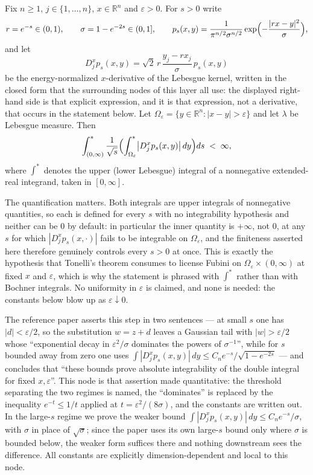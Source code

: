 \begin{lemma}
Fix $n \geq 1$, $j \in \{1,\ldots,n\}$, $x \in \mathbb{R}^n$ and $\varepsilon > 0$.
For $s > 0$ write
\[
  r = e^{-s} \in (0,1), \qquad \sigma = 1 - e^{-2s} \in (0,1],
  \qquad
  p_s(x,y) = \frac{1}{\pi^{n/2}\sigma^{n/2}}
      \exp\Bigl(-\frac{|rx-y|^2}{\sigma}\Bigr),
\]
and let
\[
  D_j^xp_s(x,y) = \sqrt2\,r\,\frac{y_j-rx_j}{\sigma}\,p_s(x,y)
\]
be the energy-normalized $x$-derivative of the Lebesgue kernel, written in the
closed form that the surrounding nodes of this layer all use: the displayed
right-hand side is that explicit expression, and it is that expression, not a
derivative, that occurs in the statement below.  Let
$\Omega_\varepsilon = \{y \in \mathbb{R}^n : |x-y| > \varepsilon\}$ and let
$\lambda$ be Lebesgue measure.  Then
\[
  \int^*_{(0,\infty)} \frac{1}{\sqrt s}
    \Bigl(\int^*_{\Omega_\varepsilon} \bigl|D_j^xp_s(x,y)\bigr|\,dy\Bigr) ds
  \;<\; \infty ,
\]
where $\int^*$ denotes the upper (lower Lebesgue) integral of a nonnegative
extended-real integrand, taken in $[0,\infty]$.

The quantification matters.  Both integrals are upper integrals of nonnegative
quantities, so each is defined for every $s$ with no integrability hypothesis
and neither can be $0$ by default: in particular the inner quantity is
$+\infty$, not $0$, at any $s$ for which $|D_j^xp_s(x,\cdot)|$ fails to be
integrable on $\Omega_\varepsilon$, and the finiteness asserted here therefore
genuinely controls every $s > 0$ at once.  This is exactly the hypothesis that
Tonelli's theorem consumes to license Fubini on
$\Omega_\varepsilon \times (0,\infty)$ at fixed $x$ and $\varepsilon$, which is
why the statement is phrased with $\int^*$ rather than with Bochner integrals.
No uniformity in $\varepsilon$ is claimed, and none is needed: the constants
below blow up as $\varepsilon \downarrow 0$.

The reference paper asserts this step in two sentences --- at small $s$ one has
$|d| < \varepsilon/2$, so the substitution $w = z+d$ leaves a Gaussian tail with
$|w| > \varepsilon/2$ whose ``exponential decay in $\varepsilon^2/\sigma$
dominates the powers of $\sigma^{-1}$'', while for $s$ bounded away from zero one
uses $\int|D_j^xp_s(x,y)|\,dy \leq C_ne^{-s}/\sqrt{1-e^{-2s}}$ --- and concludes
that ``these bounds prove absolute integrability of the double integral for
fixed $x,\varepsilon$''.  This node is that assertion made quantitative: the
threshold separating the two regimes is named, the ``dominates'' is replaced by
the inequality $e^{-t} \leq 1/t$ applied at $t = \varepsilon^2/(8\sigma)$, and
the constants are written out.  In the large-$s$ regime we prove the weaker bound
$\int|D_j^xp_s(x,y)|\,dy \leq C_ne^{-s}/\sigma$, with $\sigma$ in place of
$\sqrt\sigma$; since the paper uses its own large-$s$ bound only where $\sigma$
is bounded below, the weaker form suffices there and nothing downstream sees the
difference.  All constants are explicitly dimension-dependent and local to this
node.
\end{lemma}
